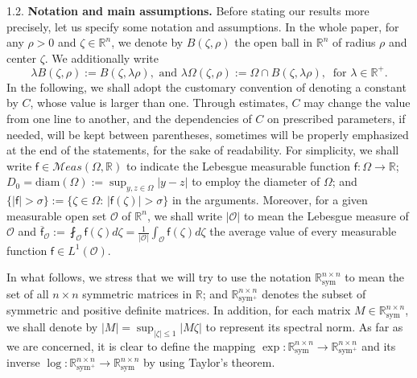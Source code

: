 \documentclass[a4paper, 11pt]{article}
\begin{document}
1.2. \textbf{Notation and main assumptions.} Before stating our results more precisely, let us specify some notation and assumptions. In the whole paper, for any $\rho>0$ and $\zeta \in \mathbb{R}^n$, we denote by $B(\zeta,\rho)$ the open ball in $\mathbb{R}^n$ of radius $\rho$ and center $\zeta$. We additionally write
$$\lambda B(\zeta,\rho) := B(\zeta, \lambda \rho), \mbox{ and } \lambda \Omega(\zeta,\rho) := \Omega \cap B(\zeta, \lambda \rho), \ \mbox{ for } \lambda \in \mathbb{R}^+.$$ 
In the following, we shall adopt the customary convention of denoting a constant by $C$, whose value is larger than one. Through estimates, $C$ may change the value from one line to another, and the dependencies of $C$ on prescribed parameters, if needed, will be kept between parentheses, sometimes will be properly emphasized at the end of the statements, for the sake of readability. For simplicity, we shall write $\mathsf{f} \in \mathcal{M}eas(\Omega,\mathbb{R})$ to indicate the Lebesgue measurable function $\mathsf{f}: \Omega \to \mathbb{R}$; $D_0=\mathrm{diam}(\Omega):=\sup_{y,z \in \Omega}{|y-z|}$ to employ the diameter of $\Omega$; and $\{|\mathsf{f}|>\sigma\} := \{\zeta \in \Omega: \, |\mathsf{f}(\zeta)|>\sigma\}$ in the arguments. Moreover, for a given measurable open set $\mathcal{O}$ of $\mathbb{R}^n$, we shall write $|\mathcal{O}|$ to mean the Lebesgue measure of $\mathcal{O}$ and $\overline{\mathsf{f}}_{\mathcal{O}} := \fint_{\mathcal{O}} \mathsf{f}(\zeta) d\zeta = \frac{1}{|\mathcal{O}|} \int_{\mathcal{O}} \mathsf{f}(\zeta) d\zeta$ the average value of every measurable function $\mathsf{f} \in L^1(\mathcal{O})$.

In what follows, we stress that we will try to use the notation $\mathbb{R}^{n \times n}_{\mathrm{sym}}$ to mean the set of all $n \times n$  symmetric matrices in $\mathbb{R}$; and $\mathbb{R}^{n \times n}_{\mathrm{sym}^+}$ denotes the subset of symmetric and positive definite matrices. In addition, for each matrix $M \in \mathbb{R}^{n \times n}_{\mathrm{sym}}$, we shall denote by $|M| = \sup_{|\zeta|\le 1} |M\zeta|$ to represent its spectral norm. As far as we are concerned, it is clear to define the mapping $\exp: \mathbb{R}^{n \times n}_{\mathrm{sym}} \to \mathbb{R}^{n \times n}_{\mathrm{sym}^+}$ and its inverse $\log: \mathbb{R}^{n \times n}_{\mathrm{sym}^+} \to \mathbb{R}^{n \times n}_{\mathrm{sym}}$ by using Taylor's theorem. 
\end{document}
